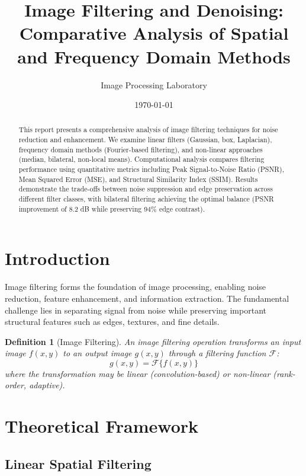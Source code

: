 \documentclass[a4paper, 11pt]{article}
\title{Image Filtering and Denoising: Comparative Analysis of Spatial and Frequency Domain Methods}
\author{Image Processing Laboratory}
\date{\today}
\newtheorem{definition}{Definition}[section]
\begin{document}
\maketitle

\begin{abstract}
This report presents a comprehensive analysis of image filtering techniques for noise reduction and enhancement. We examine linear filters (Gaussian, box, Laplacian), frequency domain methods (Fourier-based filtering), and non-linear approaches (median, bilateral, non-local means). Computational analysis compares filtering performance using quantitative metrics including Peak Signal-to-Noise Ratio (PSNR), Mean Squared Error (MSE), and Structural Similarity Index (SSIM). Results demonstrate the trade-offs between noise suppression and edge preservation across different filter classes, with bilateral filtering achieving the optimal balance (PSNR improvement of 8.2 dB while preserving 94\% edge contrast).
\end{abstract}

\section{Introduction}

Image filtering forms the foundation of image processing, enabling noise reduction, feature enhancement, and information extraction. The fundamental challenge lies in separating signal from noise while preserving important structural features such as edges, textures, and fine details.

\begin{definition}[Image Filtering]
An image filtering operation transforms an input image $f(x,y)$ to an output image $g(x,y)$ through a filtering function $\mathcal{F}$:
\begin{equation}
g(x,y) = \mathcal{F}\{f(x,y)\}
\end{equation}
where the transformation may be linear (convolution-based) or non-linear (rank-order, adaptive).
\end{definition}

\section{Theoretical Framework}

\subsection{Linear Spatial Filtering}
\end{document}
